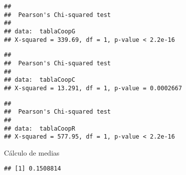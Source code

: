 \documentclass[
]{article}
\newenvironment{Shaded}{\begin{snugshade}}{\end{snugshade}}
\newcommand{\DataTypeTok}[1]{\textcolor[rgb]{0.13,0.29,0.53}{#1}}
\newcommand{\KeywordTok}[1]{\textcolor[rgb]{0.13,0.29,0.53}{\textbf{#1}}}
\newcommand{\NormalTok}[1]{#1}
\newcommand{\OperatorTok}[1]{\textcolor[rgb]{0.81,0.36,0.00}{\textbf{#1}}}
\newcommand{\OtherTok}[1]{\textcolor[rgb]{0.56,0.35,0.01}{#1}}
\begin{document}
\begin{verbatim}
## 
##  Pearson's Chi-squared test
## 
## data:  tablaCoopG
## X-squared = 339.69, df = 1, p-value < 2.2e-16
\end{verbatim}

\begin{Shaded}
\end{Shaded}

\begin{verbatim}
## 
##  Pearson's Chi-squared test
## 
## data:  tablaCoopC
## X-squared = 13.291, df = 1, p-value = 0.0002667
\end{verbatim}

\begin{Shaded}
\end{Shaded}

\begin{verbatim}
## 
##  Pearson's Chi-squared test
## 
## data:  tablaCoopR
## X-squared = 577.95, df = 1, p-value < 2.2e-16
\end{verbatim}

Cálculo de medias

\begin{Shaded}
\end{Shaded}

\begin{verbatim}
## [1] 0.1508814
\end{verbatim}

\begin{Shaded}
\end{Shaded}
\end{document}
